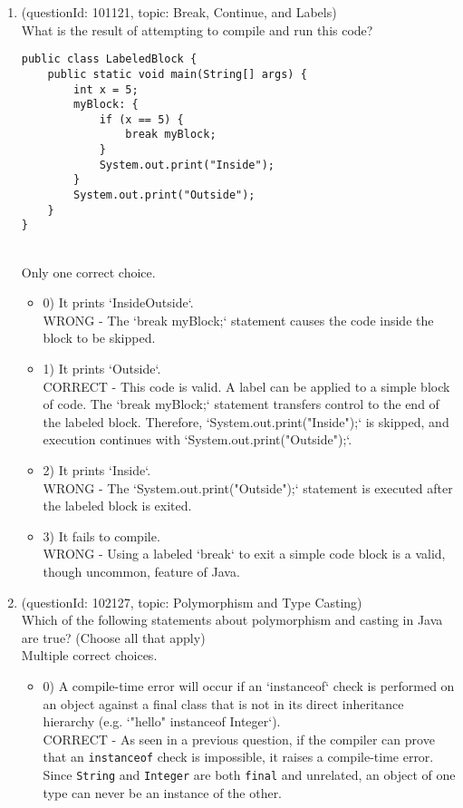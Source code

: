 \documentclass[12pt]{article}
\begin{document}
\begin{enumerate}[label=(\arabic*)]
\begin{itemize}
\end{itemize}
\item (questionId: 101121, topic: Break, Continue, and Labels) \\ 
What is the result of attempting to compile and run this code?\n\begin{verbatim}
public class LabeledBlock {
    public static void main(String[] args) {
        int x = 5;
        myBlock: {
            if (x == 5) {
                break myBlock;
            }
            System.out.print("Inside");
        }
        System.out.print("Outside");
    }
}
\end{verbatim}
\\ \noindent Only one correct choice. 
\begin{itemize}
\item 0) It prints `InsideOutside`.
 \\ 
WRONG - The `break myBlock;` statement causes the code inside the block to be skipped.

\item 1) It prints `Outside`.
 \\ 
CORRECT - This code is valid. A label can be applied to a simple block of code. The `break myBlock;` statement transfers control to the end of the labeled block. Therefore, `System.out.print("Inside");` is skipped, and execution continues with `System.out.print("Outside");`.

\item 2) It prints `Inside`.
 \\ 
WRONG - The `System.out.print("Outside");` statement is executed after the labeled block is exited.

\item 3) It fails to compile.
 \\ 
WRONG - Using a labeled `break` to exit a simple code block is a valid, though uncommon, feature of Java.

\end{itemize}
\item (questionId: 102127, topic: Polymorphism and Type Casting) \\ 
Which of the following statements about polymorphism and casting in Java are true? (Choose all that apply)
\\ \noindent Multiple correct choices. 
\begin{itemize}
\item 0) A compile-time error will occur if an `instanceof` check is performed on an object against a final class that is not in its direct inheritance hierarchy (e.g. `"hello" instanceof Integer`).
 \\ 
CORRECT - As seen in a previous question, if the compiler can prove that an \verb|instanceof| check is impossible, it raises a compile-time error. Since \verb|String| and \verb|Integer| are both \verb|final| and unrelated, an object of one type can never be an instance of the other.


\end{itemize}
\end{enumerate}
\end{document}
